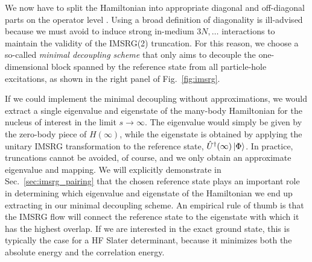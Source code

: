 {We now have to split the Hamiltonian into appropriate diagonal and off-diagonal 
parts on the operator level \cite{Kutzelnigg:1982ly,Kutzelnigg:1983ve,Kutzelnigg:1984qf}. 
Using a broad definition of diagonality is ill-advised because we must 
avoid to induce strong in-medium $3N, \ldots$ interactions to maintain the
validity of the IMSRG(2) truncation. For this reason, we choose a so-called 
\emph{minimal decoupling scheme} that only aims to decouple the one-dimensional 
block spanned by the reference state from all particle-hole excitations, as
shown in the right panel of Fig.~\ref{fig:imsrg}. 

If we could implement the minimal decoupling without approximations, 
we would extract a single eigenvalue and eigenstate of the many-body Hamiltonian
for the nucleus of interest in the limit $s\to\infty$. The eigenvalue
would simply be given by the zero-body piece of $H(\infty)$, while the eigenstate
is obtained by applying the unitary IMSRG transformation to the reference
state, $\hat{U}^\dag(\infty)\,|{\Phi}\rangle$. In practice, truncations cannot be
avoided, of course, and we only obtain an approximate eigenvalue and 
mapping. We will explicitly demonstrate in Sec.~\ref{sec:imsrg_pairing}
that the chosen reference state plays an important role in determining
which eigenvalue and eigenstate of the Hamiltonian we end up extracting
in our minimal decoupling scheme. An empirical rule of thumb is that the 
IMSRG flow will connect the reference state to the eigenstate with which 
it has the highest overlap. If we are interested in the exact ground state, 
this is typically the case for a HF Slater determinant, because it minimizes 
both the absolute energy and the correlation energy. 

}
